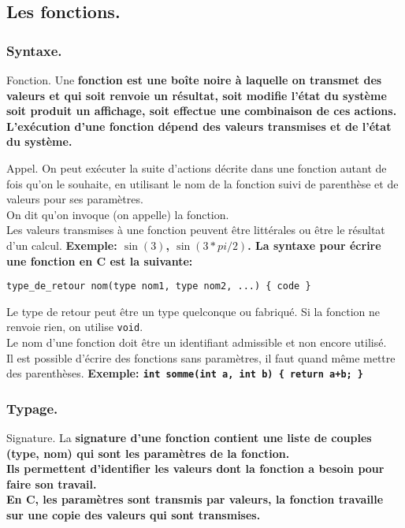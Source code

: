 \documentclass[french, 11pt]{article}
\begin{document}
\subsection{Les fonctions.}
\subsubsection{Syntaxe.}

\begin{defi}{Fonction.}{}
    Une \bf{fonction} est une boîte noire à laquelle on transmet des valeurs et qui soit renvoie un résultat, soit modifie l'état du système soit produit un affichage, soit effectue une combinaison de ces actions.\n
    L'exécution d'une fonction dépend des valeurs transmises et de l'état du système.
\end{defi}

\begin{defi}{Appel.}{}
    On peut exécuter la suite d'actions décrite dans une fonction autant de fois qu'on le souhaite, en utilisant le nom de la fonction suivi de parenthèse et de valeurs pour ses paramètres.\\
    On dit qu'on invoque (on appelle) la fonction.\\
    Les valeurs transmises à une fonction peuvent être littérales ou être le résultat d'un calcul.\n
    \bf{Exemple:} \texttt{$\sin(3)$}, \texttt{$\sin(3*pi/2)$}.\n
    La syntaxe pour écrire une fonction en C est la suivante:
    \begin{center}
        \texttt{type\_de\_retour nom(type nom1, type nom2, ...) \{ code \}}
    \end{center}
    Le type de retour peut être un type quelconque ou fabriqué. Si la fonction ne renvoie rien, on utilise \texttt{void}.\\
    Le nom d'une fonction doit être un identifiant admissible et non encore utilisé.\\
    Il est possible d'écrire des fonctions sans paramètres, il faut quand même mettre des parenthèses.\n
    \bf{Exemple:} \texttt{int somme(int a, int b) \{ return a+b; \}}
\end{defi}

\subsubsection{Typage.}

\begin{defi}{Signature.}{}
    La \bf{signature} d'une fonction contient une liste de couples (type, nom) qui sont les paramètres de la fonction.\\
    Ils permettent d'identifier les valeurs dont la fonction a besoin pour faire son travail.\\
    En C, les paramètres sont transmis par valeurs, la fonction travaille sur une copie des valeurs qui sont transmises.
\end{defi}
\end{document}

